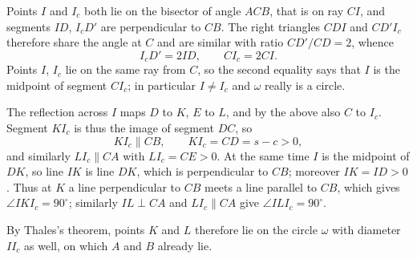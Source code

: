 {    Points $I$ and $I_c$ both lie on the bisector of angle $ACB$, that is on ray $CI$, and segments $ID$, $I_cD'$ are perpendicular to $CB$. The right triangles $CDI$ and $CD'I_c$ therefore share the angle at $C$ and are similar with ratio $CD' / CD = 2$, whence
    $$
    I_cD' = 2ID, \qquad CI_c = 2CI.
    $$
    Points $I$, $I_c$ lie on the same ray from $C$, so the second equality says that $I$ is the midpoint of segment $CI_c$; in particular $I \neq I_c$ and $\omega$ really is a circle.

    The reflection across $I$ maps $D$ to $K$, $E$ to $L$, and by the above also $C$ to $I_c$. Segment $KI_c$ is thus the image of segment $DC$, so
    $$
    KI_c \parallel CB, \qquad KI_c = CD = s - c > 0,
    $$
    and similarly $LI_c \parallel CA$ with $LI_c = CE > 0$. At the same time $I$ is the midpoint of $DK$, so line $IK$ is line $DK$, which is perpendicular to $CB$; moreover $IK = ID > 0$. Thus at $K$ a line perpendicular to $CB$ meets a line parallel to $CB$, which gives $\angle IKI_c = 90^\circ$; similarly $IL \perp CA$ and $LI_c \parallel CA$ give $\angle ILI_c = 90^\circ$.

    By Thales's theorem, points $K$ and $L$ therefore lie on the circle $\omega$ with diameter $II_c$ as well, on which $A$ and $B$ already lie.
}

